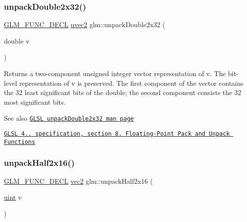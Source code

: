 \subsubsection{\texorpdfstring{unpack\+Double2x32()}{unpackDouble2x32()}}
{\footnotesize\ttfamily \hyperlink{setup_8hpp_ab2d052de21a70539923e9bcbf6e83a51}{G\+L\+M\+\_\+\+F\+U\+N\+C\+\_\+\+D\+E\+CL} \hyperlink{group__core__types_gafd2041b45eff671aa8899d2c2835eee9}{uvec2} glm\+::unpack\+Double2x32 (\begin{DoxyParamCaption}\item[{double}]{v }\end{DoxyParamCaption})}

Returns a two-\/component unsigned integer vector representation of v. The bit-\/level representation of v is preserved. The first component of the vector contains the 32 least significant bits of the double; the second component consists the 32 most significant bits.

\begin{DoxySeeAlso}{See also}
\href{http://www.opengl.org/sdk/docs/manglsl/xhtml/unpackDouble2x32.xml}{\tt G\+L\+SL unpack\+Double2x32 man page} 

\href{http://www.opengl.org/registry/doc/GLSLangSpec.4.20.8.pdf}{\tt G\+L\+SL 4.. specification, section 8. Floating-\/\+Point Pack and Unpack Functions} 
\end{DoxySeeAlso}
\mbox{\label{group__core__func__packing_gaf59b52e6b28da9335322c4ae19b5d745}} 
\subsubsection{\texorpdfstring{unpack\+Half2x16()}{unpackHalf2x16()}}
{\footnotesize\ttfamily \hyperlink{setup_8hpp_ab2d052de21a70539923e9bcbf6e83a51}{G\+L\+M\+\_\+\+F\+U\+N\+C\+\_\+\+D\+E\+CL} \hyperlink{group__core__types_gaa1618f51db67eaa145db101d8c8431d8}{vec2} glm\+::unpack\+Half2x16 (\begin{DoxyParamCaption}\item[{\hyperlink{group__core__precision_ga4fd29415871152bfb5abd588334147c8}{uint}}]{v }\end{DoxyParamCaption})}

